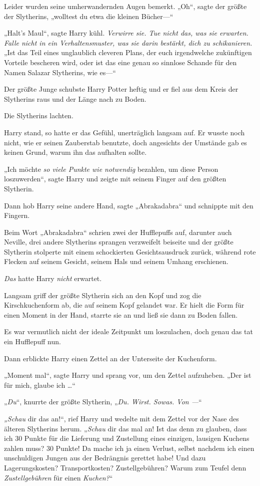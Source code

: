{Leider wurden seine umherwandernden Augen bemerkt. „Oh“, sagte der größte der Slytherins, „wolltest du etwa die kleinen Bücher—“

„Halt's Maul“, sagte Harry kühl. \emph{Verwirre sie. Tue nicht das, was sie erwarten. Falle nicht in ein Verhaltensmuster, was sie darin bestärkt, dich zu schikanieren.} „Ist das Teil eines unglaublich cleveren Plans, der euch irgendwelche zukünftigen Vorteile bescheren wird, oder ist das eine genau so sinnlose Schande für den Namen Salazar Slytherins, wie es—“

Der größte Junge schubste Harry Potter heftig und er fiel aus dem Kreis der Slytherins raus und der Länge nach zu Boden.

Die Slytherins lachten.

Harry stand, so hatte er das Gefühl, unerträglich langsam auf. Er wusste noch nicht, wie er seinen Zauberstab benutzte, doch angesichts der Umstände gab es keinen Grund, warum ihn das aufhalten sollte.

„Ich möchte \emph{so viele Punkte wie notwendig} bezahlen, um diese Person loszuwerden“, sagte Harry und zeigte mit seinem Finger auf den größten Slytherin.

Dann hob Harry seine andere Hand, sagte „Abrakadabra“ und schnippte mit den Fingern.

Beim Wort „Abrakadabra“ schrien zwei der Hufflepuffs auf, darunter auch Neville, drei andere Slytherins sprangen verzweifelt beiseite und der größte Slytherin stolperte mit einem schockierten Gesichtsausdruck zurück, während rote Flecken auf seinem Gesicht, seinem Hals und seinem Umhang erschienen.

\emph{Das} hatte Harry \emph{nicht} erwartet.

Langsam griff der größte Slytherin sich an den Kopf und zog die Kirschkuchenform ab, die auf seinem Kopf gelandet war. Er hielt die Form für einen Moment in der Hand, starrte sie an und ließ sie dann zu Boden fallen.

Es war vermutlich nicht der ideale Zeitpunkt um loszulachen, doch genau das tat ein Hufflepuff nun.

Dann erblickte Harry einen Zettel an der Unterseite der Kuchenform.

„Moment mal“, sagte Harry und sprang vor, um den Zettel aufzuheben. „Der ist für mich, glaube ich …“

„\emph{Du}“, knurrte der größte Slytherin, „\emph{Du. Wirst. Sowas. Von —}“

\emph{„Schau} dir das an!“, rief Harry und wedelte mit dem Zettel vor der Nase des älteren Slytherins herum. „\emph{Schau} dir das mal an! Ist das denn zu glauben, dass ich 30 Punkte für die Lieferung und Zustellung eines einzigen, lausigen Kuchens zahlen muss? 30 Punkte! Da mache ich ja einen Verlust, selbst nachdem ich einen unschuldigen Jungen aus der Bedrängnis gerettet habe! Und dazu Lagerungskosten? Transportkosten? Zustellgebühren? Warum zum Teufel denn \emph{Zustellgebühren} für einen \emph{Kuchen?}“

}
